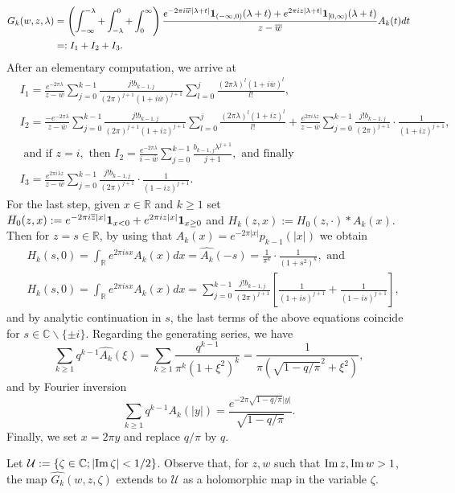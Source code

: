 \documentclass[a4paper,reqno,12pt]{amsart}
\newcommand{\U}{\mathcal{U}}
\renewcommand{\r}{\mathbb{R}}
\newcommand{\cp}{\mathbb{C}} %
\newcommand{\ft}{\widehat}
\newcommand{\la}{\lambda}
\newcommand{\ov}[1]{\overline{#1}}
\newcommand{\w}{\ov{w}}
\newcommand{\cd}{\cdot}
\newcommand{\1}{{\bf 1}}
\renewcommand{\Im}{{\rm Im}\,}
\begin{document}
\begin{align*}
G_k(w,z,\la)&=\left(\int_{-\infty}^{-\la}+\int_{-\la}^{0}+\int_{0}^{\infty}\right)\frac{e^{-2\pi i\w |\la+t|}\1_{(-\infty,0)}(\la+t)+e^{2\pi iz|\la+t|}\1_{[0,\infty)}(\la+t)}{z-\w} A_k(t) dt\\
&=:I_1+I_2+I_3.
\end{align*}
After an elementary computation, we arrive at
\begin{align*}
&I_1=\frac{e^{-2\pi\la}}{z-\w}\sum_{j=0}^{k-1} \frac{j!b_{k-1,j}}{(2\pi)^{j+1}(1+i\w)^{j+1}}\sum_{l=0}^{j} \frac{(2\pi\la)^l(1+i\w)^l}{l!},\\
&I_2=\frac{-e^{-2\pi\la}}{z-\w} \sum_{j=0}^{k-1} \frac{j!b_{k-1,j}}{(2\pi)^{j+1}(1+iz)^{j+1}}\sum_{l=0}^{j} \frac{(2\pi\la)^l(1+iz)^l}{l!}+\frac{e^{2\pi i\la z}}{z-\w}\sum_{j=0}^{k-1} \frac{j!b_{k-1,j}}{(2\pi)^{j+1}}\cd\frac{1}{(1+iz)^{j+1}},\\
&\text{ and if } z=i, \text{ then } I_2=\frac{e^{-2\pi\la}}{i-\w}\sum_{j=0}^{k-1} \frac{b_{k-1,j}\la^{j+1}}{j+1}, \text{ and finally }\\
&I_3=\frac{e^{2\pi i\la z}}{z-\w}\sum_{j=0}^{k-1} \frac{j!b_{k-1,j}}{(2\pi)^{j+1}}\cd\frac{1}{(1-iz)^{j+1}}.
\end{align*}
For the last step, given $x\in\r$ and $k\geq1$ set $H_0(z,x):=e^{-2\pi i\ov{z}|x|}\1_{x<0}+e^{2\pi iz|x|}\1_{x\geq0}$ and $H_k(z,x):=H_0(z,\cd)* A_k(x)$. Then for $z=s\in\r$, by using that $A_k(x)=e^{-2\pi|x|}p_{k-1}(|x|)$ we obtain
\begin{align*}
&H_k(s,0)=\int_{\r} e^{2\pi isx}A_k(x)dx=\ft{A_k}(-s)=\frac{1}{\pi^k}\cd\frac{1}{(1+s^2)^k}, \text{ and}\\
&H_k(s,0)=\int_{\r} e^{2\pi isx}A_k(x)dx=\sum_{j=0}^{k-1} \frac{j!b_{k-1,j}}{(2\pi)^{j+1}}\left[\frac{1}{(1+is)^{j+1}}+\frac{1}{(1-is)^{j+1}}\right],
\end{align*}
and by analytic continuation in $s$, the last terms of the above equations coincide for $s\in\cp\backslash\{\pm i\}$. Regarding the generating series, we have
$$
\sum_{k\geq 1} q^{k-1} \ft{A_k}(\xi) = \sum_{k\geq 1} \frac{q^{k-1}}{\pi^k (1+\xi^2)^k} = \frac{1}{\pi(\sqrt{1-q/\pi}^2+\xi^2)},
$$
and by Fourier inversion
$$
\sum_{k\geq 1} q^{k-1} A_k(|y|) = \frac{e^{-2\pi\sqrt{1-q/\pi}|y| }}{\sqrt{1-q/\pi}}.
$$
Finally, we set $x=2\pi y$ and replace $q/\pi$ by $q$.

Let $\U:=\{\zeta\in\cp;|\Im{\zeta}|<1/2\}$. Observe that, for $z,w$ such that $\Im{z},\Im{w}>1$, the map $\ft{G_k}(w,z,\zeta)$ extends to $\U$ as a holomorphic map in the variable $\zeta$.  
\end{document}
